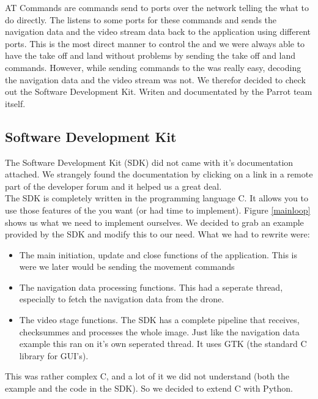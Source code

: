 AT Commands are commands send to ports over the network telling the \Ardrone what to do directly. The \Ardrone listens to some ports for these commands and sends the 
navigation data and the video stream data back to the application using different ports. This is the most direct manner to control the \Ardrone and we were always able
to have the \Ardrone take off and land without problems by sending the take off and land commands. However, while sending commands to the \Ardrone was really easy, decoding
the navigation data and the video stream was not. We therefor decided to check out the Software Development Kit. Writen and documentated by the Parrot team itself. 

\subsection{Software Development Kit}
The Software Development Kit (SDK) did not came with it's documentation attached. We strangely found the documentation by clicking on a link in a remote part of the 
\Ardrone developer forum and it helped us a great deal. \\

The SDK is completely written in the programming language C. It allows you to use those features of the \Ardrone you want (or had time to implement). Figure \ref{mainloop}
shows us what we need to implement ourselves. We decided to grab an example provided by the SDK and modify this to our need. What we had to rewrite were:
\begin{itemize}
    \item The main initiation, update and close functions of the application. This is were we later would be sending the movement commands
    \item The navigation data processing functions. This had a seperate thread, especially to fetch the navigation data from the drone.
    \item The video stage functions. The SDK has a complete pipeline that receives, checksummes and processes the whole image. Just like the navigation data example
this ran on it's own seperated thread. It uses GTK (the standard C library for GUI's). 
\end{itemize}
This was rather complex C, and a lot of it we did not understand (both the example and the code in the SDK). So we decided to extend C with Python.

